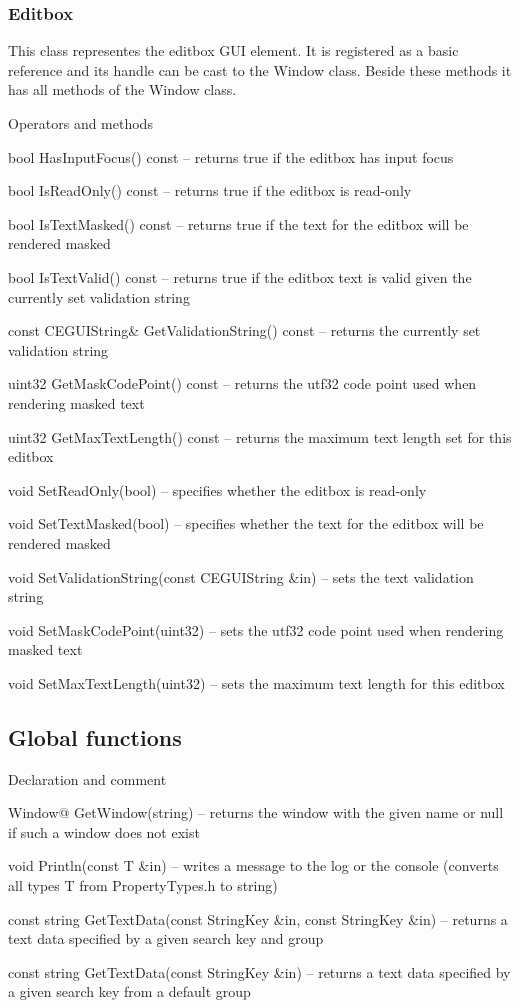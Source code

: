 \subsubsection{Editbox}

This class representes the editbox GUI element. It is registered as a basic reference and its handle can be cast to the Window class. Beside these methods it has all methods of the Window class.

\begin{titled-itemize}{Operators and methods}
  \item bool HasInputFocus() const -- returns true if the editbox has input focus
  \item bool IsReadOnly() const -- returns true if the editbox is read-only
  \item bool IsTextMasked() const -- returns true if the text for the editbox will be rendered masked
  \item bool IsTextValid() const -- returns true if the editbox text is valid given the currently set
 validation string
  \item const CEGUIString\& GetValidationString() const -- returns the currently set validation string
  \item uint32 GetMaskCodePoint() const -- returns the utf32 code point used when rendering masked text
  \item uint32 GetMaxTextLength() const -- returns the maximum text length set for this editbox
  \item void SetReadOnly(bool) -- specifies whether the editbox is read-only
  \item void SetTextMasked(bool) -- specifies whether the text for the editbox will be rendered masked
  \item void SetValidationString(const CEGUIString \&in) -- sets the text validation string
  \item void SetMaskCodePoint(uint32) -- sets the utf32 code point used when rendering masked text
  \item void SetMaxTextLength(uint32) -- sets the maximum text length for this editbox
\end{titled-itemize}

\subsection{Global functions}

\begin{titled-itemize}{Declaration and comment}
  \item Window@ GetWindow(string) -- returns the window with the given name or null if such a window does not exist
  \item void Println(const T \&in) -- writes a message to the log or the console (converts all types T from PropertyTypes.h to string)
  \item const string GetTextData(const StringKey \&in, const StringKey \&in) -- returns a text data specified by a given search key and group
  \item const string GetTextData(const StringKey \&in) -- returns a text data specified by a given search key from a default group
\end{titled-itemize}

